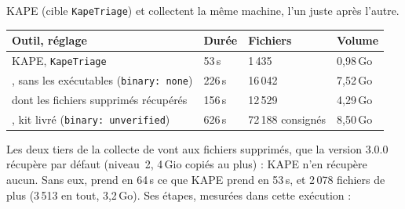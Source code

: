 \documentclass[11pt,a4paper,oneside]{report}
\begin{document}
KAPE (cible \texttt{KapeTriage}) et \wac{} collectent la même machine, l'un
juste après l'autre.

\begin{longtable}{@{}L{6.2cm}L{2.2cm}L{2.6cm}L{4.0cm}@{}}
\toprule
\textbf{Outil, réglage} & \textbf{Durée} & \textbf{Fichiers} & \textbf{Volume} \\
\midrule\endhead
KAPE, \texttt{KapeTriage} & 53\,s & 1\,435 & 0,98\,Go \\
\wac{}, sans les exécutables (\texttt{binary: none}) & 226\,s & 16\,042 & 7,52\,Go \\
\quad dont les fichiers supprimés récupérés & 156\,s & 12\,529 & 4,29\,Go \\
\wac{}, kit livré (\texttt{binary: unverified}) & 626\,s & 72\,188 consignés & 8,50\,Go \\
\bottomrule
\end{longtable}

Les deux tiers de la collecte de \wac{} vont aux fichiers supprimés, que la
version 3.0.0 récupère par défaut (niveau~2, 4\,Gio copiés au plus) : KAPE
n'en récupère aucun. Sans eux, \wac{} prend en 64\,s ce que KAPE prend en
53\,s, et 2\,078 fichiers de plus (3\,513 en tout, 3,2\,Go). Ses étapes,
mesurées dans cette exécution :
\end{document}
